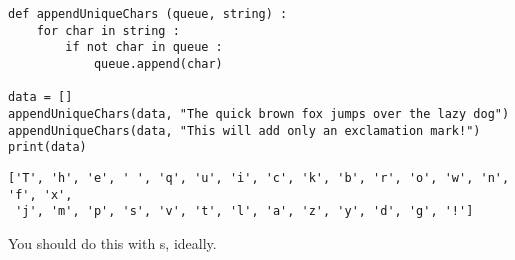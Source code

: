 
\begin{frame}[fragile]

\vspace{-6pt}
\begin{codebox}
\begin{verbatim}
def appendUniqueChars (queue, string) :
    for char in string :
        if not char in queue :
            queue.append(char)

data = []
appendUniqueChars(data, "The quick brown fox jumps over the lazy dog")
appendUniqueChars(data, "This will add only an exclamation mark!")
print(data)
\end{verbatim}
\end{codebox}

\vspace{-12pt}
\begin{cmdbox}
\begin{verbatim}
['T', 'h', 'e', ' ', 'q', 'u', 'i', 'c', 'k', 'b', 'r', 'o', 'w', 'n', 'f', 'x',
 'j', 'm', 'p', 's', 'v', 't', 'l', 'a', 'z', 'y', 'd', 'g', '!']
\end{verbatim}
\end{cmdbox}

\vspace{-9pt}
\begin{hintbox}
\small
You should do this with s, ideally.
\end{hintbox}
%
\end{frame}